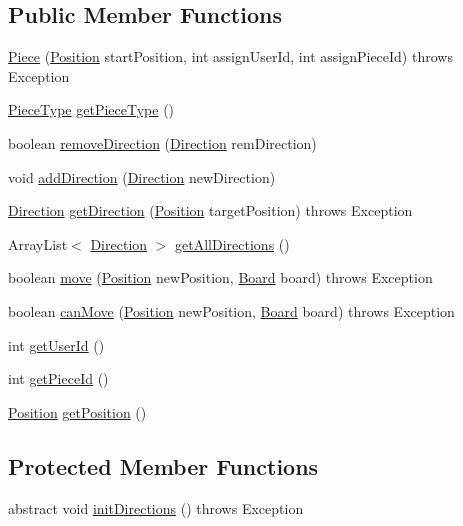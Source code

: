 \subsection*{Public Member Functions}
\begin{DoxyCompactItemize}
\item 
\hyperlink{classPiece_1_1Piece_a997635ad14cc0eb5d3df1b998d05df1d}{Piece} (\hyperlink{classUtil_1_1Position}{Position} start\-Position, int assign\-User\-Id, int assign\-Piece\-Id)  throws Exception 
\item 
\hyperlink{enumPiece_1_1PieceType}{Piece\-Type} \hyperlink{classPiece_1_1Piece_abe02eb4013ec562dfad1056245088add}{get\-Piece\-Type} ()
\item 
boolean \hyperlink{classPiece_1_1Piece_a472ffe2c12ba2a9d2d4a73e38c3f8d7f}{remove\-Direction} (\hyperlink{classUtil_1_1Direction}{Direction} rem\-Direction)
\item 
void \hyperlink{classPiece_1_1Piece_ab292128370c9df7d112cc7972bb8b1d0}{add\-Direction} (\hyperlink{classUtil_1_1Direction}{Direction} new\-Direction)
\item 
\hyperlink{classUtil_1_1Direction}{Direction} \hyperlink{classPiece_1_1Piece_a4068d2bdf5c732c0eee560df93cea966}{get\-Direction} (\hyperlink{classUtil_1_1Position}{Position} target\-Position)  throws Exception 
\item 
Array\-List$<$ \hyperlink{classUtil_1_1Direction}{Direction} $>$ \hyperlink{classPiece_1_1Piece_aee0dc72aed56d9a5c9612d3a9d545672}{get\-All\-Directions} ()
\item 
boolean \hyperlink{classPiece_1_1Piece_a23a749e9ef159a908cb66ddf8575b4a6}{move} (\hyperlink{classUtil_1_1Position}{Position} new\-Position, \hyperlink{classBoard_1_1Board}{Board} board)  throws Exception 
\item 
boolean \hyperlink{classPiece_1_1Piece_ad6d3c365ebdbee1c5a128d5cb645a5c3}{can\-Move} (\hyperlink{classUtil_1_1Position}{Position} new\-Position, \hyperlink{classBoard_1_1Board}{Board} board)  throws Exception 
\item 
int \hyperlink{classPiece_1_1Piece_a39912c2af6e604892dc897105aa511eb}{get\-User\-Id} ()
\item 
int \hyperlink{classPiece_1_1Piece_abb5dd621ae9e76e2aa622a67bf6219b0}{get\-Piece\-Id} ()
\item 
\hyperlink{classUtil_1_1Position}{Position} \hyperlink{classPiece_1_1Piece_a1aa0fc5fa0e9f96c701f7d3b7145560e}{get\-Position} ()
\end{DoxyCompactItemize}
\subsection*{Protected Member Functions}
\begin{DoxyCompactItemize}
\item 
abstract void \hyperlink{classPiece_1_1Piece_af8bf9c4edb5bd73c91f3f8b21793ca5b}{init\-Directions} ()  throws Exception
\end{DoxyCompactItemize}
